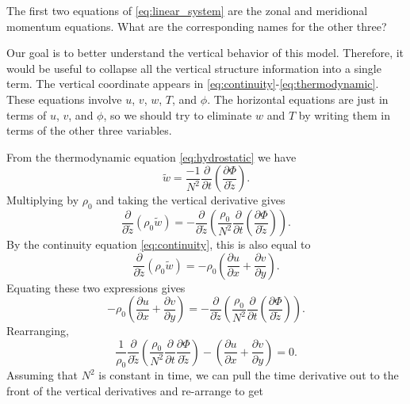 \documentclass{article}
\numberwithin{equation}{section}
\newcommand{\w}{\tilde{w}}
\newcommand{\z}{\tilde{z}}
\begin{document}
%
%
\begin{exercise}
The first two equations of \eqref{eq:linear_system} are the zonal and meridional momentum equations. What are the corresponding names for the other three?
\end{exercise}
%
Our goal is to better understand the vertical behavior of this model. Therefore, it would be useful to collapse all the vertical structure information into a single term. The vertical coordinate appears in \eqref{eq:continuity}-\eqref{eq:thermodynamic}. These equations involve $u$, $v$, $w$, $T$, and $\phi$. The horizontal equations are just in terms of $u$, $v$, and $\phi$, so we should try to eliminate $w$ and $T$ by writing them in terms of the other three variables. 
%
\par From the thermodynamic equation \eqref{eq:hydrostatic} we have
\begin{equation}
    \w = \frac{-1}{N^2}\frac{\partial}{\partial t}\left(\frac{\partial \Phi}{\partial \z}\right).
\end{equation}
%
Multiplying by $\rho_0$ and taking the vertical derivative gives
\begin{equation}
    \frac{\partial}{\partial \z}\left(\rho_0 \w\right) = -\frac{\partial}{\partial\z}\left(\frac{\rho_0}{N^2}\frac{\partial}{\partial t}\left(\frac{\partial\Phi}{\partial \z}\right)\right).
\end{equation}
%
By the continuity equation \eqref{eq:continuity}, this is also equal to 
\begin{equation}
\frac{\partial}{\partial \z}(\rho_0\w) = -\rho_0\left(\frac{\partial u}{\partial x} + \frac{\partial v}{\partial y}\right).
\end{equation}
%
Equating these two expressions gives
\begin{equation}
  -\rho_0\left(\frac{\partial u}{\partial x} + \frac{\partial v}{\partial y}\right) = -\frac{\partial}{\partial\z}\left(\frac{\rho_0}{N^2}\frac{\partial}{\partial t}\left(\frac{\partial\Phi}{\partial \z}\right)\right).
\end{equation}
%
Rearranging, 
\begin{equation}
  \frac{1}{\rho_0}\frac{\partial}{\partial\z}\left(\frac{\rho_0}{N^2}\frac{\partial}{\partial t}\frac{\partial\Phi}{\partial\z}\right) - \left(\frac{\partial u}{\partial x} + \frac{\partial v}{\partial y}\right) = 0.
\end{equation}
%
Assuming that $N^2$ is constant in time, we can pull the time derivative out to the front of the vertical derivatives and re-arrange to get
\end{document}
